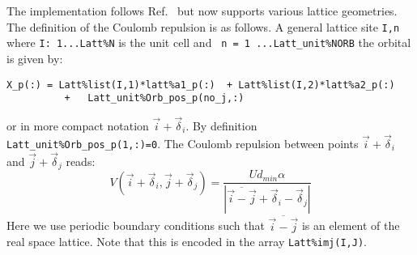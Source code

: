 The implementation follows Ref.~\cite{Hohenadler14}  but now supports various lattice geometries.    The definition of  the Coulomb repulsion is as follows. 
A general lattice site  \texttt{I,n}   where \texttt{I: 1...Latt\%N} is the unit cell and \texttt{ n = 1 ...Latt\_unit\%NORB}  the orbital  is given by: 
\begin{lstlisting}[style=fortran]
X_p(:) = Latt%list(I,1)*latt%a1_p(:)  + Latt%list(I,2)*latt%a2_p(:) 
          +   Latt_unit%Orb_pos_p(no_j,:)
\end{lstlisting}
or in more compact notation $ \vec{i}  + \vec{\delta}_i $.   By definition \texttt{Latt\_unit\%Orb\_pos\_p(1,:)=0}.
The Coulomb repulsion between points   $ \vec{i}  + \vec{\delta}_i $   and $ \vec{j}  + \vec{\delta}_j $   reads: 
\begin{equation}
	V(\vec{i}  + \vec{\delta}_i ,  \vec{j}  + \vec{\delta}_j  )  =  \frac{U d_{min} \alpha}{  |  \overline{\vec{i} - \vec{j}} + \vec{\delta}_i - \vec{\delta}_j  |}  
\end{equation}
Here  we use periodic boundary conditions such that  $\overline{\vec{i} - \vec{j}}$  is an element of the real space lattice. Note that this is encoded in the array \texttt{Latt\%imj(I,J)}.


